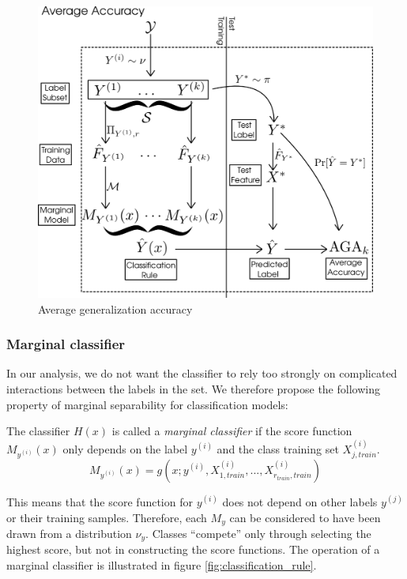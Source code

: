 \documentclass[12pt]{article}
\begin{document}
\begin{figure}[h]
\centering
\includegraphics[scale = 0.3]{average_risk.png}
\caption{Average generalization accuracy}\label{fig:average_risk}
\end{figure}

\subsubsection{Marginal classifier}

In our analysis, we do not
want the classifier to rely too strongly on complicated interactions
between the labels in the set. We therefore propose the following
property of marginal separability for classification models:

\begin{definition}
The classifier $H(x)$ is called a \emph{marginal classifier} if the score 
function $M_{y^{(i)}}(x)$
only depends on the label $y^{(i)}$ and the class training set $X_{j, train}^{(i)}$.
\[M_{y^{(i)}}(x) = g(x; y^{(i)},X_{1, train}^{(i)},...,X_{r_{train}, train}^{(i)})\]
\end{definition}
This means that the score function for $y^{(i)}$ does not depend on other labels $y^{(j)}$ or their training 
samples.  Therefore, each $M_y$ can be considered to have been drawn from a distribution $\nu_y$.
Classes ``compete'' only through selecting the highest score, 
but not in constructing the score functions. 
The operation of a marginal classifier is illustrated in figure
\ref{fig:classification_rule}.
\end{document}
